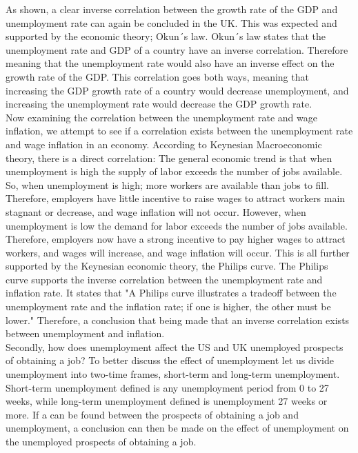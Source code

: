 As shown, a clear inverse correlation between the growth rate of the GDP and unemployment rate can again be concluded in the UK.
This was expected and supported by the economic theory; Okun´s law.
Okun´s law states that the unemployment rate and GDP of a country have an inverse correlation.
Therefore meaning that the unemployment rate would also have an inverse effect on the growth rate of the GDP. \cite{Economics_Okuns_Law}
This correlation goes both ways, meaning that increasing the GDP growth rate of a country would decrease unemployment, and increasing the unemployment rate would decrease the GDP growth rate. \\

Now examining the correlation between the unemployment rate and wage inflation, we attempt to see if a correlation exists between the unemployment rate and wage inflation in an economy.
According to Keynesian Macroeconomic theory, there is a direct correlation:
The general economic trend is that when unemployment is high the supply of labor exceeds the number of jobs available.
So, when unemployment is high; more workers are available than jobs to fill.
Therefore, employers have little incentive to raise wages to attract workers main stagnant or decrease, and wage inflation will not occur.
However, when unemployment is low the demand for labor exceeds the number of jobs available. 
Therefore, employers now have a strong incentive to pay higher wages to attract workers, and wages will increase, and wage inflation will occur.\cite{Economics_Unemployment_Inflation}
This is all further supported by the Keynesian economic theory, the Philips curve.
The Philips curve supports the inverse correlation between the unemployment rate and inflation rate.
It states that "A Philips curve illustrates a tradeoff between the unemployment rate and the inflation rate; if one is higher, the other must be lower." \cite{Economics_Philips_Curve}
Therefore, a conclusion that being made that an inverse correlation exists between unemployment and inflation. \\

Secondly, how does unemployment affect the US and UK unemployed prospects of obtaining a job?
To better discuss the effect of unemployment let us divide unemployment into two-time frames, short-term and long-term unemployment.
Short-term unemployment defined is any unemployment period from 0 to 27 weeks, while long-term unemployment defined is unemployment 27 weeks or more. \cite{Short_Long_unemployment_Defined}
If a  can be found between the prospects of obtaining a job and unemployment, a conclusion can then be made on the effect of unemployment on the unemployed prospects of obtaining a job.

